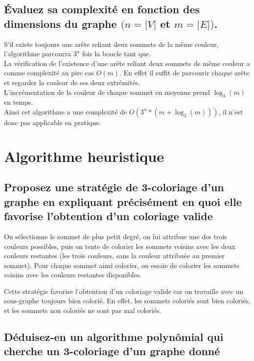 \documentclass[a4paper, 11pt]{article}
\begin{document}
    \subsection{Évaluez sa complexité en fonction des dimensions du graphe $(n = |V| $ et $ m = |E|)$.}\label{subsec:Q2B}
    S'il existe toujours une arête reliant deux sommets de la même couleur, l'algorithme parcourra $3^n$ fois la boucle tant que.\\
    La vérification de l'existence d'une arête reliant deux sommets de même couleur a comme complexité au pire cas $O(m)$.
    En effet il suffit de parcourir chaque arête et regarder la couleur de ses deux extrémités.\\
    L'incrémentation de la couleur de chaque sommet en moyenne prend $\log_3(m)$ en temps.\\
    Ainsi cet algorithme a une complexité de $O(3^n * \left( m + \log_3(m) \right) )$, il n'est donc pas applicable en pratique.

    \newpage

    \section{Algorithme heuristique}\label{sec:algorithme-heuristique}

    \subsection{Proposez une stratégie de 3-coloriage d'un graphe
    en expliquant précisément en quoi elle favorise l'obtention d'un coloriage valide}\label{subsec:Q3A}
    On sélectionne le sommet de plus petit degré, on lui attribue une des trois couleurs possibles,
    puis on tente de colorier les sommets voisins avec les deux couleurs restantes (les trois couleurs, sans la couleur attribuée au premier sommet).
    Pour chaque sommet ainsi colorier, on essaie de colorier les sommets voisins avec les couleurs restantes disponibles.

    Cette stratégie favorise l'obtention d'un coloriage valide car on travaille avec un sous-graphe toujours bien colorié.
    En effet, les sommets coloriés sont bien coloriés, et les sommets non coloriés ne sont pas mal coloriés.

    \subsection{Déduisez-en un algorithme polynômial qui cherche un 3-coloriage d’un graphe donné}\label{subsec:Q3B}
\end{document}
